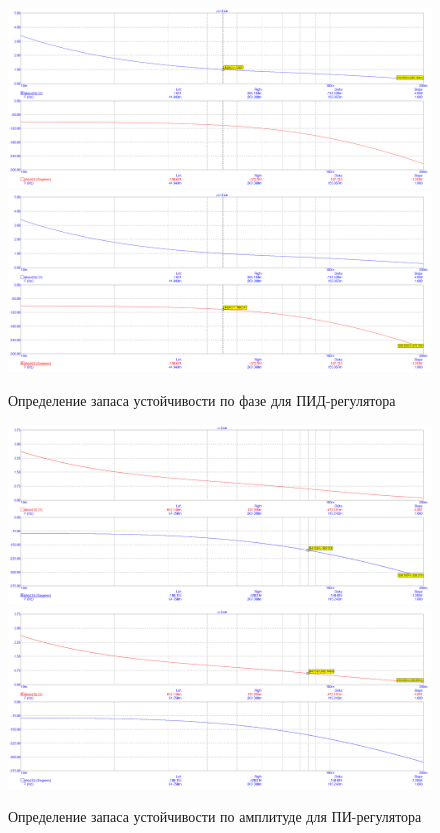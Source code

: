 	\begin{figure}[H]
		\centering
		\includegraphics[scale=0.35]{./images/5.png}
		\includegraphics[scale=0.35]{./images/6.png}
		\caption{Определение запаса устойчивости по фазе для ПИД-регулятора} 
	\end{figure}
	
	\begin{figure}[H]
		\centering
		\includegraphics[scale=0.35]{./images/9.png}
		\includegraphics[scale=0.35]{./images/10.png}
		\caption{Определение запаса устойчивости по амплитуде для ПИ-регулятора} 
	\end{figure}
	
